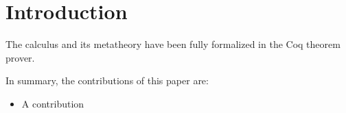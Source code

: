 \section{Introduction}

The calculus and its metatheory
have been fully formalized in the Coq theorem prover.  

In summary, the contributions of this paper are:

\begin{itemize}

\item A contribution

\end{itemize}